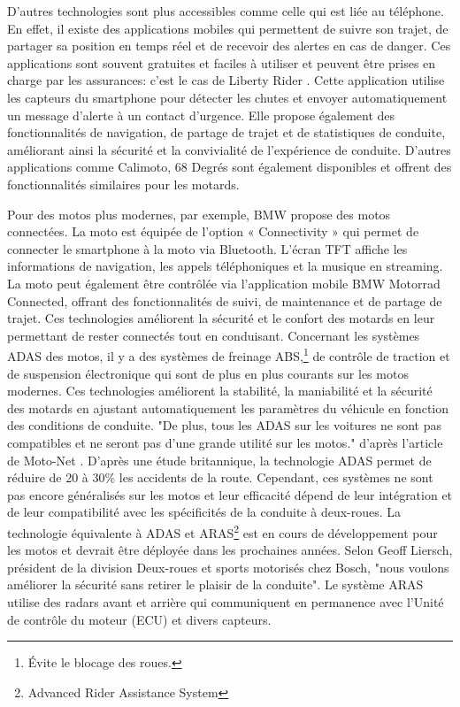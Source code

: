 D'autres technologies sont plus accessibles comme celle qui est liée au téléphone. En effet, il existe des applications mobiles qui permettent de suivre son trajet, de partager sa position en temps réel et de recevoir des alertes en cas de danger. Ces applications sont souvent gratuites et faciles à utiliser et peuvent être prises en charge par les assurances: c'est le cas de Liberty Rider \cite{liberty_rider}. Cette application utilise les capteurs du smartphone pour détecter les chutes et envoyer automatiquement un message d'alerte à un contact d’urgence. Elle propose également des fonctionnalités de navigation, de partage de trajet et de statistiques de conduite, améliorant ainsi la sécurité et la convivialité de l’expérience de conduite. D'autres applications comme Calimoto, 68 Degrés sont également disponibles et offrent des fonctionnalités similaires pour les motards.

Pour des motos plus modernes, par exemple, BMW propose des motos connectées\cite{bmw_adas}. La moto est équipée de l’option « Connectivity » qui permet de connecter le smartphone à la moto via Bluetooth. L’écran TFT affiche les informations de navigation, les appels téléphoniques et la musique en streaming. La moto peut également être contrôlée via l’application mobile BMW Motorrad Connected, offrant des fonctionnalités de suivi, de maintenance et de partage de trajet. Ces technologies améliorent la sécurité et le confort des motards en leur permettant de rester connectés tout en conduisant.
Concernant les systèmes ADAS des motos\cite{moto_adas}, il y a des systèmes de freinage ABS,\footnote{Évite le blocage des roues.} de contrôle de traction et de suspension électronique qui sont de plus en plus courants sur les motos modernes. Ces technologies améliorent la stabilité, la maniabilité et la sécurité des motards en ajustant automatiquement les paramètres du véhicule en fonction des conditions de conduite. "De plus, tous les ADAS sur les voitures ne sont pas compatibles et ne seront pas d’une grande utilité sur les motos." d'après l'article de Moto-Net \cite{moto_adas}.
D'après une étude britannique, la technologie ADAS permet de réduire de 20 à 30\%\cite{moto_aras} les accidents de la route. Cependant, ces systèmes ne sont pas encore généralisés sur les motos et leur efficacité dépend de leur intégration et de leur compatibilité avec les spécificités de la conduite à deux-roues. La technologie équivalente à ADAS et ARAS\footnote{Advanced Rider Assistance System} est en cours de développement pour les motos et devrait être déployée dans les prochaines années.
Selon Geoff Liersch, président de la division Deux-roues et sports motorisés chez Bosch, "nous voulons améliorer la sécurité sans retirer le plaisir de la conduite"\cite{aras_bosh}.
Le système ARAS utilise des radars avant et arrière qui communiquent en permanence avec l’Unité de contrôle du moteur (ECU) et divers capteurs.

